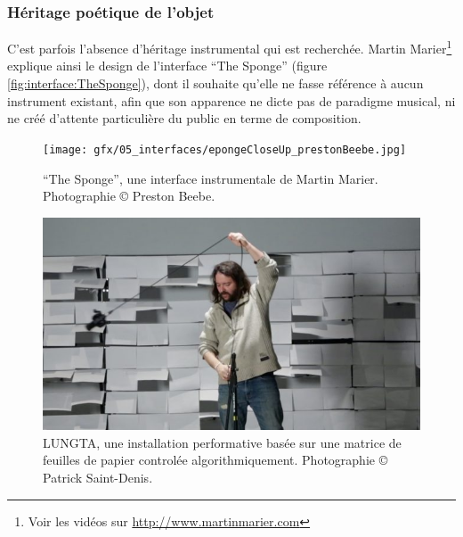 \subsubsection{Héritage poétique de l'objet}

\noindent C'est parfois l'absence d'héritage instrumental qui est recherchée. Martin Marier\footnote{Voir les vidéos sur \url{http://www.martinmarier.com}} explique ainsi le design de l'interface ``The Sponge'' \cite{marier_sponge_2010} (figure \ref{fig:interface:TheSponge}), dont il souhaite qu'elle ne fasse référence à aucun instrument existant, afin que son apparence ne dicte pas de paradigme musical, ni ne créé d'attente particulière du public en terme de composition.\\
\begin{figure}[!htbp]
	\captionsetup{format=plain}%
	\centering
	\begin{minipage}[t]{0.48\textwidth}
		\texttt{[image: gfx/05\_interfaces/epongeCloseUp\_prestonBeebe.jpg]}
		\caption[``The Sponge'' de Martin Marier]{``The Sponge'', une interface instrumentale de Martin Marier. Photographie © Preston Beebe.}
		\label{fig:interface:TheSponge}
	\end{minipage}
	\hspace{.02\linewidth}
	\begin{minipage}[t]{0.48\textwidth}
	    \includegraphics[width=\linewidth]{gfx/05_interfaces/Saint-Denis-Lungta.jpg}
		\caption[LUNGTA de Patrick Saint-Denis]{LUNGTA, une installation performative basée sur une matrice de feuilles de papier controlée algorithmiquement. Photographie © Patrick Saint-Denis.}
		\label{fig:interface:lungta}
	\end{minipage}
\end{figure}
